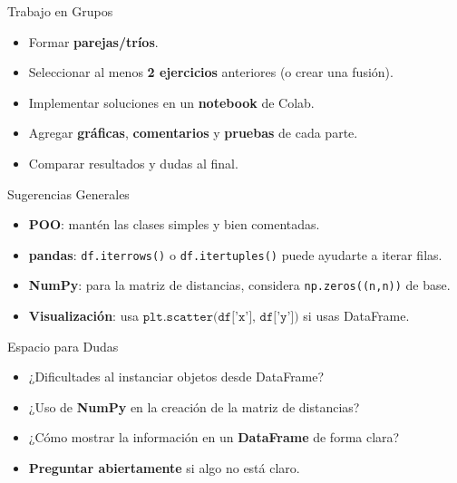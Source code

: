 \documentclass[10pt]{beamer}
\begin{document}
\begin{frame}{Trabajo en Grupos}
  \begin{itemize}
    \item Formar \textbf{parejas/tríos}.
    \item Seleccionar al menos \textbf{2 ejercicios} anteriores (o crear una fusión).
    \item Implementar soluciones en un \textbf{notebook} de Colab.
    \item Agregar \textbf{gráficas}, \textbf{comentarios} y \textbf{pruebas} de cada parte.
    \item Comparar resultados y dudas al final.
  \end{itemize}
\end{frame}

\begin{frame}{Sugerencias Generales}
  \begin{itemize}
    \item \textbf{POO}: mantén las clases simples y bien comentadas.
    \item \textbf{pandas}: \texttt{df.iterrows()} o \texttt{df.itertuples()} puede ayudarte a iterar filas.
    \item \textbf{NumPy}: para la matriz de distancias, considera \texttt{np.zeros((n,n))} de base.
    \item \textbf{Visualización}: usa \(\texttt{plt.scatter(df['x'], df['y'])}\) si usas DataFrame.
  \end{itemize}
\end{frame}

\begin{frame}{Espacio para Dudas}
  \begin{itemize}
    \item ¿Dificultades al instanciar objetos desde DataFrame?
    \item ¿Uso de \textbf{NumPy} en la creación de la matriz de distancias?
    \item ¿Cómo mostrar la información en un \textbf{DataFrame} de forma clara?
    \item \textbf{Preguntar abiertamente} si algo no está claro.
  \end{itemize}
\end{frame}
\end{document}
